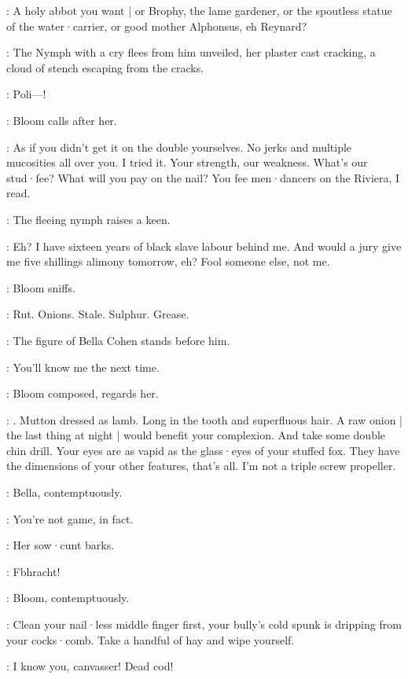 \Bloom:
A holy abbot you want |
or Brophy,
the lame gardener,
or the spoutless statue of the water·carrier,
or good mother Alphonsus,
eh Reynard?

:
The Nymph with a cry flees from him unveiled,
her plaster cast cracking,
a cloud of stench escaping from the cracks.

\Nymph:
Poli---!

:
Bloom calls after her.

\Bloom:
As if you didn't get it on the double yourselves.
No jerks and multiple mucosities all over you.
I tried it.
Your strength,
our weakness.
What's our stud·fee?
What will you pay on the nail?
You fee men·dancers on the Riviera,
I read.

:
The fleeing nymph raises a keen.

\Bloom:
Eh?
I have sixteen years of black slave labour behind me.
And would a jury give me five shillings alimony tomorrow,
eh?
Fool someone else,
not me.

:
Bloom sniffs.

\Bloom:
Rut.
Onions.
Stale.
Sulphur.
Grease.


:
The figure of Bella Cohen stands before him.

\Bella:
You'll know me the next time.

:
Bloom composed,
regards her.

\Bloom:
.
Mutton dressed as lamb.
Long in the tooth and superfluous hair.
A raw onion |
the last thing at night |
would benefit your complexion.
And take some double chin drill.
Your eyes are as vapid as the glass·eyes of your stuffed fox.
They have the dimensions of your other features,
that's all.
I'm not a triple screw propeller.

:
Bella,
contemptuously.

\Bella:
You're not game,
in fact.

:
Her sow·cunt barks.

\Bella:
Fbhracht!%

:
Bloom,
contemptuously.

\Bloom:
Clean your nail·less middle finger first,
your bully's cold spunk is dripping from your cocks·comb.
Take a handful of hay and wipe yourself.

\Bella:
I know you,
canvasser!
Dead cod!

